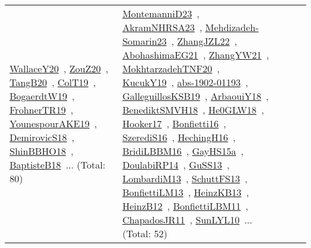 {\begin{longtable}{lp{3cm}>{\raggedright\arraybackslash}p{6cm}>{\raggedright\arraybackslash}p{6cm}>{\raggedright\arraybackslash}p{8cm}}
\href{works/WallaceY20.pdf}{WallaceY20}~\cite{WallaceY20}, \href{works/ZouZ20.pdf}{ZouZ20}~\cite{ZouZ20}, \href{works/TangB20.pdf}{TangB20}~\cite{TangB20}, \href{works/ColT19.pdf}{ColT19}~\cite{ColT19}, \href{works/BogaerdtW19.pdf}{BogaerdtW19}~\cite{BogaerdtW19}, \href{works/FrohnerTR19.pdf}{FrohnerTR19}~\cite{FrohnerTR19}, \href{works/YounespourAKE19.pdf}{YounespourAKE19}~\cite{YounespourAKE19}, \href{works/DemirovicS18.pdf}{DemirovicS18}~\cite{DemirovicS18}, \href{works/ShinBBHO18.pdf}{ShinBBHO18}~\cite{ShinBBHO18}, \href{works/BaptisteB18.pdf}{BaptisteB18}~\cite{BaptisteB18}... (Total: 80) & \href{works/MontemanniD23.pdf}{MontemanniD23}~\cite{MontemanniD23}, \href{works/AkramNHRSA23.pdf}{AkramNHRSA23}~\cite{AkramNHRSA23}, \href{works/Mehdizadeh-Somarin23.pdf}{Mehdizadeh-Somarin23}~\cite{Mehdizadeh-Somarin23}, \href{works/ZhangJZL22.pdf}{ZhangJZL22}~\cite{ZhangJZL22}, \href{works/AbohashimaEG21.pdf}{AbohashimaEG21}~\cite{AbohashimaEG21}, \href{works/ZhangYW21.pdf}{ZhangYW21}~\cite{ZhangYW21}, \href{works/MokhtarzadehTNF20.pdf}{MokhtarzadehTNF20}~\cite{MokhtarzadehTNF20}, \href{works/KucukY19.pdf}{KucukY19}~\cite{KucukY19}, \href{works/abs-1902-01193.pdf}{abs-1902-01193}~\cite{abs-1902-01193}, \href{works/GalleguillosKSB19.pdf}{GalleguillosKSB19}~\cite{GalleguillosKSB19}, \href{works/ArbaouiY18.pdf}{ArbaouiY18}~\cite{ArbaouiY18}, \href{works/BenediktSMVH18.pdf}{BenediktSMVH18}~\cite{BenediktSMVH18}, \href{works/He0GLW18.pdf}{He0GLW18}~\cite{He0GLW18}, \href{works/Hooker17.pdf}{Hooker17}~\cite{Hooker17}, \href{works/Bonfietti16.pdf}{Bonfietti16}~\cite{Bonfietti16}, \href{works/SzerediS16.pdf}{SzerediS16}~\cite{SzerediS16}, \href{works/HechingH16.pdf}{HechingH16}~\cite{HechingH16}, \href{works/BridiLBBM16.pdf}{BridiLBBM16}~\cite{BridiLBBM16}, \href{works/GayHS15a.pdf}{GayHS15a}~\cite{GayHS15a}, \href{works/DoulabiRP14.pdf}{DoulabiRP14}~\cite{DoulabiRP14}, \href{works/GuSS13.pdf}{GuSS13}~\cite{GuSS13}, \href{works/LombardiM13.pdf}{LombardiM13}~\cite{LombardiM13}, \href{works/SchuttFS13.pdf}{SchuttFS13}~\cite{SchuttFS13}, \href{works/BonfiettiLM13.pdf}{BonfiettiLM13}~\cite{BonfiettiLM13}, \href{works/HeinzKB13.pdf}{HeinzKB13}~\cite{HeinzKB13}, \href{works/HeinzB12.pdf}{HeinzB12}~\cite{HeinzB12}, \href{works/BonfiettiLBM11.pdf}{BonfiettiLBM11}~\cite{BonfiettiLBM11}, \href{works/ChapadosJR11.pdf}{ChapadosJR11}~\cite{ChapadosJR11}, \href{works/SunLYL10.pdf}{SunLYL10}~\cite{SunLYL10}... (Total: 52)\\

\end{longtable}}
